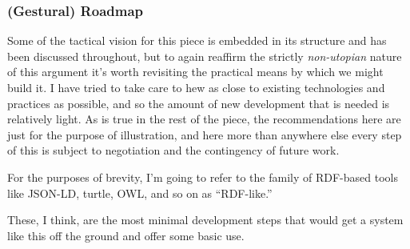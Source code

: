 \documentclass[10pt]{article}
\begin{document}
\begin{multicols}{2}
\hypertarget{gestural-roadmap}{%
\subsubsection{(Gestural) Roadmap}\label{gestural-roadmap}}

Some of the tactical vision for this piece is embedded in its structure
and has been discussed throughout, but to again reaffirm the strictly
\emph{non-utopian} nature of this argument it's worth revisiting the
practical means by which we might build it. I have tried to take care to
hew as close to existing technologies and practices as possible, and so
the amount of new development that is needed is relatively light. As is
true in the rest of the piece, the recommendations here are just for the
purpose of illustration, and here more than anywhere else every step of
this is subject to negotiation and the contingency of future work.

For the purposes of brevity, I'm going to refer to the family of
RDF-based tools like JSON-LD, turtle, OWL, and so on as ``RDF-like.''

These, I think, are the most minimal development steps that would get a
system like this off the ground and offer some basic use.

\begin{enumerate}
\def\labelenumi{\arabic{enumi}.}


\end{enumerate}
\end{multicols}
\end{document}
